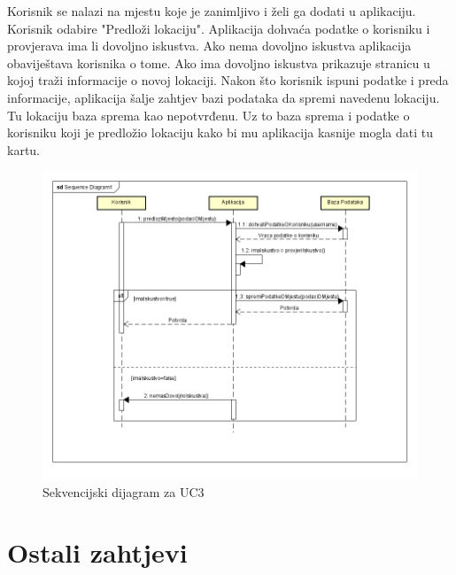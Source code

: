     Korisnik se nalazi na mjestu koje je zanimljivo i želi ga dodati u aplikaciju. Korisnik odabire "Predloži lokaciju". Aplikacija dohvaća podatke o korisniku i provjerava ima li dovoljno iskustva. Ako nema dovoljno iskustva aplikacija obaviještava korisnika o tome. Ako ima dovoljno iskustva prikazuje stranicu u kojoj traži informacije o novoj lokaciji. Nakon što korisnik ispuni podatke i preda informacije, aplikacija šalje zahtjev bazi podataka da spremi navedenu lokaciju. Tu lokaciju baza sprema kao nepotvrđenu. Uz to baza sprema i podatke o korisniku koji je predložio lokaciju kako bi mu aplikacija kasnije mogla dati tu kartu.
		\begin{figure}[H]
			\includegraphics[width=\textwidth]{slike/SeqUC5.png} %
			\caption{Sekvencijski dijagram za UC3}
			\label{fig:promjene5} %
		\end{figure}
\eject

\section{Ostali zahtjevi}


	
